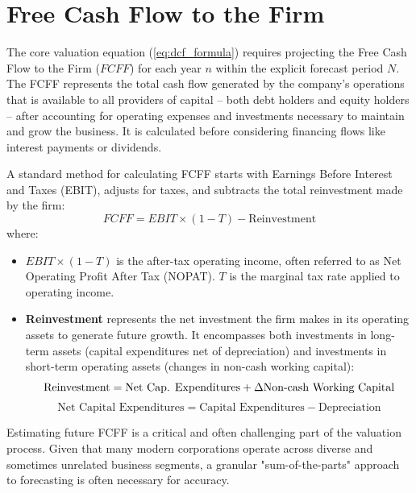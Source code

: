 \chapter{Free Cash Flow to the Firm} \label{chap:cash_flow}

The core valuation equation (\ref{eq:dcf_formula}) requires projecting the Free Cash Flow to the Firm (\(FCFF\)) for each year \(n\) within the explicit forecast period \(N\). The FCFF represents the total cash flow generated by the company's operations that is available to all providers of capital – both debt holders and equity holders – after accounting for operating expenses and investments necessary to maintain and grow the business. It is calculated before considering financing flows like interest payments or dividends.

A standard method for calculating FCFF starts with Earnings Before Interest and Taxes (EBIT), adjusts for taxes, and subtracts the total reinvestment made by the firm:
\begin{equation} \label{eq:fcff_definition}
    FCFF = EBIT \times (1 - T) - \text{Reinvestment}
\end{equation}
where:
\begin{itemize}
    \item \(EBIT \times (1 - T)\) is the after-tax operating income, often referred to as Net Operating Profit After Tax (NOPAT). \(T\) is the marginal tax rate applied to operating income.
    \item \textbf{Reinvestment} represents the net investment the firm makes in its operating assets to generate future growth. It encompasses both investments in long-term assets (capital expenditures net of depreciation) and investments in short-term operating assets (changes in non-cash working capital):
          \begin{equation} \label{eq:reinvestment_definition}
              \text{Reinvestment} = \text{Net Cap. Expenditures} + \Delta \text{Non-cash Working Capital}\\[6pt]
          \end{equation}
          \[
              \text{Net Capital Expenditures}=\text{Capital Expenditures}-\text{Depreciation}
          \]
\end{itemize}

Estimating future FCFF is a critical and often challenging part of the valuation process. Given that many modern corporations operate across diverse and sometimes unrelated business segments, a granular "sum-of-the-parts" approach to forecasting is often necessary for accuracy. 

